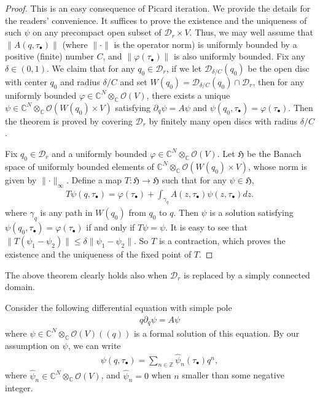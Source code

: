 \documentclass[12pt,b5paper,notitlepage]{report}
\theoremstyle{definition}
\theoremstyle{plain}
\newcommand{\fk}{\mathfrak}
\newcommand{\mc}{\mathcal}
\newcommand{\wht}{\widehat}
\newcommand{\scr}{\mathscr}
\newcommand{\mbb}{\mathbb}
\newcommand{\blt}{\bullet}
\newcommand{\Cbb}{\mathbb C}
\numberwithin{equation}{section}
\begin{document}
\begin{proof}
This is an easy consequence of Picard iteration. We provide the details for the readers' convenience. It suffices to prove the existence and the uniqueness of such $\psi$ on any precompact open subset of $\mc D_r\times V$. Thus, we may well assume that $\lVert A(q,\tau_\blt)\lVert$ (where $\lVert\cdot\lVert$ is the operator norm) is uniformly bounded by a positive (finite) number $C$, and $\lVert \varphi(\tau_\blt)\lVert$ is also uniformly bounded. Fix any $\delta\in(0,1)$. We claim that for any $q_0\in \mc D_r$, if we let $\mc D_{\delta/C}(q_0)$ be the open disc with center $q_0$ and radius $\delta/C$ and set $W(q_0)=\mc D_{\delta/C}(q_0)\cap\mc D_r$, then for any uniformly bounded $\varphi\in\Cbb^N\otimes_\Cbb\scr O(V)$, there exists a unique $\psi\in\Cbb^N\otimes_\Cbb\scr O(W(q_0)\times V)$ satisfying $\partial_q\psi=A\psi$ and $\psi(q_0,\tau_\blt)=\varphi(\tau_\blt)$. Then the theorem is proved by covering $\mc D_r$ by finitely many open discs with radius $\delta/C$.

Fix $q_0\in\mc D_r$ and a uniformly bounded $\varphi\in\Cbb^N\otimes_\Cbb\scr O(V)$. Let $\fk H$ be the Banach space of uniformly bounded elements of $\Cbb^N\otimes_\Cbb\scr O(W(q_0)\times V)$, whose norm is given by $\lVert \cdot\lVert_\infty$. Define a map $T:\fk H\rightarrow\fk H$ such that for any $\psi\in\fk H$,
\begin{align*}
T\psi(q,\tau_\blt)=\varphi(\tau_\blt)+\int_{\gamma_q} A(z,\tau_\blt)\psi(z,\tau_\blt)dz.
\end{align*}
where $\gamma_q$ is any path in $W(q_0)$ from $q_0$ to $q$. Then  $\psi$ is a solution satisfying $\psi(q_0,\tau_\blt)=\varphi(\tau_\blt)$ if and only if $T\psi=\psi$. It is easy to see that $\lVert T(\psi_1-\psi_2)\lVert\leq\delta \lVert \psi_1-\psi_2\lVert$. So $T$ is a contraction, which proves the existence and the uniqueness of the fixed point of $T$.
\end{proof}

The above theorem clearly holds also when $\mc D_r$ is replaced by a simply connected domain. 





Consider the following  differential equation with simple pole
\begin{align}
q\partial_q\psi=A\psi\label{eq27}
\end{align}
where $\psi\in\Cbb^N\otimes_\Cbb\scr O(V)((q))$ is a formal solution of this equation. By our assumption on $\psi$, we can write 
\begin{align}
\psi(q,\tau_\blt)=\sum_{n\in\mbb Z}\wht\psi_n(\tau_\blt)q^n,\label{eq24}
\end{align}
where $\wht\psi_n\in\Cbb^N\otimes_\Cbb\scr O(V)$, and  $\wht\psi_n=0$ when $n$ smaller than some  negative integer.
\end{document}
